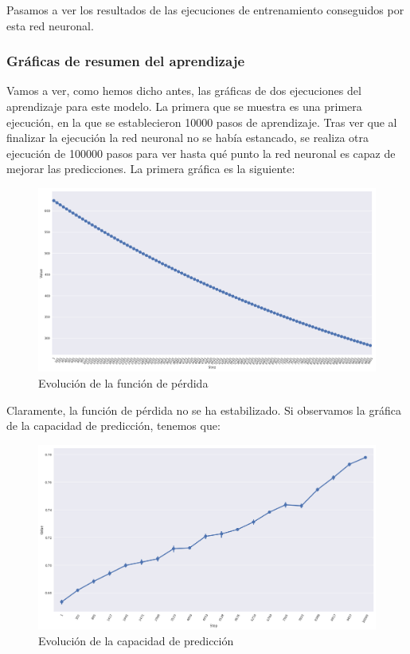 \documentclass[11pt]{article}
\theoremstyle{plain}
\theoremstyle{definition}
\begin{document}
Pasamos a ver los resultados de las ejecuciones de entrenamiento
conseguidos por esta red neuronal.

\subsubsection{Gráficas de resumen del aprendizaje}

Vamos a ver, como hemos dicho antes, las gráficas de dos ejecuciones
del aprendizaje para este modelo. La primera que se muestra es una
primera ejecución, en la que se establecieron 10000 pasos de
aprendizaje.  Tras ver que al finalizar la ejecución la red neuronal
no se había estancado, se realiza otra ejecución de 100000 pasos para
ver hasta qué punto la red neuronal es capaz de mejorar las
predicciones.  La primera gráfica es la siguiente:

\begin{figure}[H]
  \centering \includegraphics[width=.95\textwidth]{imgs/loss_wd_1}
  \caption{Evolución de la función de pérdida}
\end{figure}

Claramente, la función de pérdida no se ha estabilizado. Si observamos
la gráfica de la capacidad de predicción, tenemos que:

\begin{figure}[H]
  \centering \includegraphics[width=.95\textwidth]{imgs/accuracy_wd_1}
  \caption{Evolución de la capacidad de predicción}
\end{figure}
\end{document}
